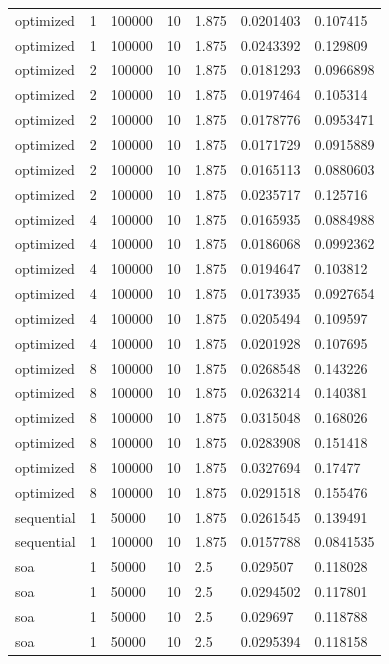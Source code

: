 \begin{table}[ht]
\begin{tabular}{lllllll}
optimized & 1 & 100000 & 10 & 1.875 & 0.0201403 & 0.107415 \\ 
optimized & 1 & 100000 & 10 & 1.875 & 0.0243392 & 0.129809 \\ 
optimized & 2 & 100000 & 10 & 1.875 & 0.0181293 & 0.0966898 \\ 
optimized & 2 & 100000 & 10 & 1.875 & 0.0197464 & 0.105314 \\ 
optimized & 2 & 100000 & 10 & 1.875 & 0.0178776 & 0.0953471 \\ 
optimized & 2 & 100000 & 10 & 1.875 & 0.0171729 & 0.0915889 \\ 
optimized & 2 & 100000 & 10 & 1.875 & 0.0165113 & 0.0880603 \\ 
optimized & 2 & 100000 & 10 & 1.875 & 0.0235717 & 0.125716 \\ 
optimized & 4 & 100000 & 10 & 1.875 & 0.0165935 & 0.0884988 \\ 
optimized & 4 & 100000 & 10 & 1.875 & 0.0186068 & 0.0992362 \\ 
optimized & 4 & 100000 & 10 & 1.875 & 0.0194647 & 0.103812 \\ 
optimized & 4 & 100000 & 10 & 1.875 & 0.0173935 & 0.0927654 \\ 
optimized & 4 & 100000 & 10 & 1.875 & 0.0205494 & 0.109597 \\ 
optimized & 4 & 100000 & 10 & 1.875 & 0.0201928 & 0.107695 \\ 
optimized & 8 & 100000 & 10 & 1.875 & 0.0268548 & 0.143226 \\ 
optimized & 8 & 100000 & 10 & 1.875 & 0.0263214 & 0.140381 \\ 
optimized & 8 & 100000 & 10 & 1.875 & 0.0315048 & 0.168026 \\ 
optimized & 8 & 100000 & 10 & 1.875 & 0.0283908 & 0.151418 \\ 
optimized & 8 & 100000 & 10 & 1.875 & 0.0327694 & 0.17477 \\ 
optimized & 8 & 100000 & 10 & 1.875 & 0.0291518 & 0.155476 \\ 
sequential & 1 & 50000 & 10 & 1.875 & 0.0261545 & 0.139491 \\ 
sequential & 1 & 100000 & 10 & 1.875 & 0.0157788 & 0.0841535 \\ 
soa & 1 & 50000 & 10 & 2.5 & 0.029507 & 0.118028 \\ 
soa & 1 & 50000 & 10 & 2.5 & 0.0294502 & 0.117801 \\ 
soa & 1 & 50000 & 10 & 2.5 & 0.029697 & 0.118788 \\ 
soa & 1 & 50000 & 10 & 2.5 & 0.0295394 & 0.118158 \\ 

\end{tabular}
\end{table}
